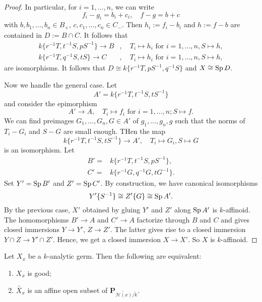 \begin{proof}
    In particular, for $i=1,\ldots,n$, we can write
    \[
        f_i-g_i=b_i+c_i,\quad f-g=b+c  
    \]
    with $b,b_1,\ldots,b_n\in B_+$, $c,c_1,\ldots,c_n\in C_-$. Then $h_i:=f_i-b_i$ and $h:=f-b$ are contained in $D:=B\cap C$. It follows that 
    \[
        \begin{aligned}
        k\{r^{-1}T,t^{-1}S,pS^{-1}\}\rightarrow B &,\quad T_i\mapsto h_i \text{ for } i=1,\ldots,n,S\mapsto h,\\
        k\{r^{-1}T,q^{-1}S,tS\}\rightarrow C &,\quad T_i\mapsto h_i \text{ for } i=1,\ldots,n,S\mapsto h,
        \end{aligned}
    \]
    are isomorphisms. It follows that $D\cong k\{r^{-1}T,pS^{-1},q^{-1}S\}$ and $X\cong \operatorname{Sp} D$.

    Now we handle the general case. Let
    \[
        A'=  k\{r^{-1}T,t^{-1}S,tS^{-1}\}
    \]
    and consider the epimorphism
    \[
        A'\rightarrow A,\quad T_i\mapsto f_i\text{ for }i=1,\ldots,n; S\mapsto f.  
    \]
    We can find preimages $G_1,\ldots,G_n,G\in A'$ of $g_1,\ldots,g_n,g$ such that the norms of $T_i-G_i$ and $S-G$ are small enough. THen the map
    \[
        k\{r^{-1}T,t^{-1}S,tS^{-1}\}\rightarrow A',\quad T_i\mapsto G_i,S\mapsto G
    \]
    is an isomorphism. Let
    \[
        \begin{aligned}
            B'= & k\{r^{-1}T,t^{-1}S,pS^{-1}\},\\
            C'= & k\{r^{-1}G,q^{-1}G,tG^{-1}\}.
        \end{aligned}  
    \]
    Set $Y'=\operatorname{Sp} B'$ and $Z'=\operatorname{Sp} C'$. By construction, we have canonical isomorphisms
    \[
        Y'\{S^{-1}\}\cong Z'\{G\}\cong \operatorname{Sp} A'.  
    \]
    By the previous case, $X'$ obtained by gluing $Y'$ and $Z'$ along $\operatorname{Sp} A'$ is $k$-affinoid. The homomorphisms $B'\rightarrow A$ and $C'\rightarrow A$ factorize through $B$ and $C$ and gives closed immersions $Y\rightarrow Y'$, $Z\rightarrow Z'$. The latter gives rise to a closed immersion $Y\cap Z\rightarrow Y'\cap Z'$. Hence, we get a closed immersion $X\rightarrow X'$. So $X$ is $k$-affinoid.
\end{proof}


\begin{thm}\label{thm-goodgermandreduction}
    Let $X_x$ be a $k$-analytic germ. Then the following are equivalent:
    \begin{enumerate}
        \item $X_x$ is good;
        \item $\widetilde{X_x}$ is an affine open subset of $\mathbf{P}_{\widetilde{\mathscr{H}(x)}/\tilde{k}}$.
    \end{enumerate}
\end{thm}

